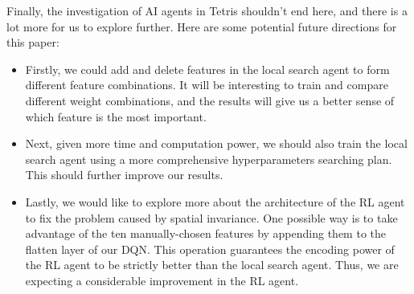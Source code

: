 \documentclass[letterpaper]{article} %
\begin{document}
Finally, the investigation of AI agents in Tetris shouldn't end here, and there is a lot more for us to explore further. Here are some potential future directions for this paper:
\begin{itemize}
  \item 
  Firstly, we could add and delete features in the local search agent to form different feature combinations. It will be interesting to train and compare different weight combinations, and the results will give us a better sense of which feature is the most important.
  \item 
  Next, given more time and computation power, we should also train the local search agent using a more comprehensive hyperparameters searching plan. This should further improve our results.
  \item 
  Lastly, we would like to explore more about the architecture of the RL agent to fix the problem caused by spatial invariance.  One possible way is to take advantage of the ten manually-chosen features by appending them to the flatten layer of our DQN. This operation guarantees the encoding power of the RL agent to be strictly better than the local search agent. Thus, we are expecting a considerable improvement in the RL agent.
\end{itemize}



  
\end{document}
